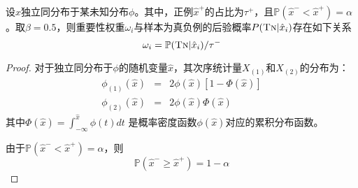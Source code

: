 \begin{theorem}[后验概率估计]\label{the:poster}
设$\hat{x}$独立同分布于某未知分布$\phi$。其中，正例$\hat x^+$的占比为$\tau^+$，且$\mathbb P (\hat x^- < \hat x^+)= \alpha$ 。取$\beta = 0.5$，则重要性权重$\omega_i$与样本为真负例的后验概率$P(\textsc{Tn}|\hat{x}_i)$存在如下关系
\[\omega_i = \mathbb P(\textsc{Tn}|\hat{x}_i)/\tau^-\]
\begin{proof}
对于独立同分布于$\phi$的随机变量$\hat{x}$，其次序统计量$X_{(1)}$和$X_{(2)}$的分布为：
\begin{eqnarray}
	\phi_{(1)}(\hat{x}) &=& 2\phi(\hat{x}) [1-\Phi(\hat{x})] \nonumber \\
	\phi_{(2)}(\hat{x}) &=& 2\phi(\hat{x}) \Phi(\hat{x}) \nonumber
\end{eqnarray}
其中$\Phi(\hat{x}) = \int_{ - \infty }^{\hat{x}} \phi(t) dt$ 是概率密度函数$\phi(\hat{x})$对应的累积分布函数。

由于$\mathbb P (\hat x^- < \hat x^+)= \alpha$，则
\[\mathbb P (\hat x^- \geq \hat x^+)=1- \alpha\]


\end{proof}
\end{theorem}
